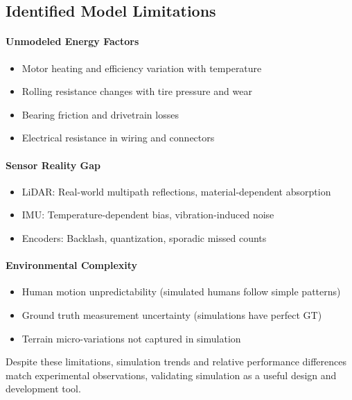 \subsection{Identified Model Limitations}

\paragraph{Unmodeled Energy Factors}
\begin{itemize}
    \item Motor heating and efficiency variation with temperature
    \item Rolling resistance changes with tire pressure and wear
    \item Bearing friction and drivetrain losses
    \item Electrical resistance in wiring and connectors
\end{itemize}

\paragraph{Sensor Reality Gap}
\begin{itemize}
    \item LiDAR: Real-world multipath reflections, material-dependent absorption
    \item IMU: Temperature-dependent bias, vibration-induced noise
    \item Encoders: Backlash, quantization, sporadic missed counts
\end{itemize}

\paragraph{Environmental Complexity}
\begin{itemize}
    \item Human motion unpredictability (simulated humans follow simple patterns)
    \item Ground truth measurement uncertainty (simulations have perfect GT)
    \item Terrain micro-variations not captured in simulation
\end{itemize}

Despite these limitations, simulation trends and relative performance differences match experimental observations, validating simulation as a useful design and development tool.


